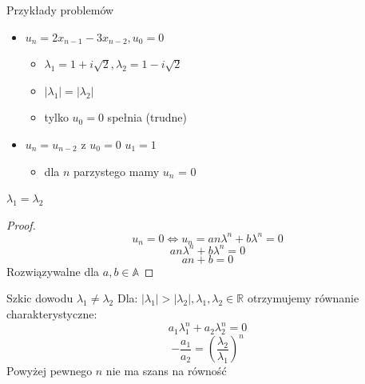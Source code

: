 \documentclass[handout]{beamer}
\def\A{\mathbb{A}}
\theoremstyle{definition}
\theoremstyle{named}
\begin{document}
\begin{frame}{Przykłady problemów}
\begin{itemize}
    \item $u_{n} = 2 x_{n-1} - 3 x_{n-2}, u_{0} = 0$
    \begin{itemize}
        \item $\lambda_1 = 1 + i\sqrt{2}, \lambda_2 = 1 - i\sqrt{2}$
        \pause
        \item $|\lambda_{1}| = |\lambda_{2}| $
        \pause
        \item tylko $u_{0} = 0$ spełnia (trudne) 
    \end{itemize}
    \pause
    \item $u_{n} = u_{n-2}$ z $u_{0} = 0$ $u_{1} = 1$
    \pause
    \begin{itemize}
        \item dla $n$ parzystego mamy $u_n$ = 0 \cite{litt}
    \end{itemize}

\end{itemize}
\end{frame}


\begin{frame}{$\lambda_1= \lambda_2$}

\begin{proof}
    \pause
    $$u_n = 0 \iff  u_n = a n \lambda^{n} + b \lambda^{n} = 0$$
    \pause
    $$ a n \lambda^{n} + b \lambda^{n} = 0 $$
    \pause
    $$ a n + b = 0 $$
    \pause
    Rozwiązywalne dla $a, b \in \A $
\end{proof}

    
\end{frame}




\begin{frame}{Szkic dowodu $\lambda_1 \neq \lambda_2$}
    Dla: 
    \pause
    $|\lambda_1| > |\lambda_2|, \lambda_1, \lambda_2 \in \mathbb{R}$
    \pause
    otrzymujemy równanie charakterystyczne:
    $$
       a_1 \lambda_{1}^{n} + a_2 \lambda_{2}^{n} = 0
    $$
    \pause
    $$
        - \frac{a_1}{a_2} = (\frac{\lambda_2}{\lambda_1})^{n}
    $$
    \pause
    Powyżej pewnego $n$ nie ma szans na równość 
\end{frame}
\end{document}
